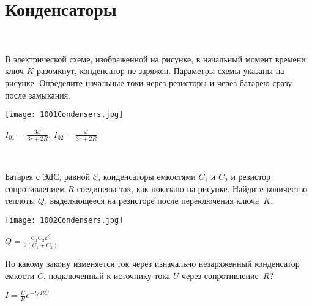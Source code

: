 \section{Конденсаторы}

\begin{ex}
\hspace{0pt} \\
\begin{minipage}{.65\textwidth}
В электрической схеме, изображенной на рисунке, в начальный момент времени ключ $K$ разомкнут, конденсатор не заряжен. 
Параметры схемы указаны на рисунке. Определите начальные токи через резисторы и через батарею сразу после замыкания.
\end{minipage}
\begin{minipage}{.35\textwidth}
\centering
\texttt{[image: 1001Condensers.jpg]}
\end{minipage}
\begin{ans}
$I_{01} = \frac{3 \mathcal{E}}{3r+2R}$, $I_{02} = \frac{\mathcal{E}}{3r+2R}$
\end{ans}
\end{ex}

\begin{ex}
\hspace{0pt} \\
\begin{minipage}{.65\textwidth}
Батарея с ЭДС, равной $\mathcal{E}$, конденсаторы емкостями $C_1$ и $C_2$ и резистор сопротивлением $R$ соединены так, как показано на рисунке. 
Найдите количество теплоты $Q$, выделяющееся на резисторе после переключения ключа~$K$.
\end{minipage}
\begin{minipage}{.35\textwidth}
\centering
\texttt{[image: 1002Condensers.jpg]}
\end{minipage}
\begin{ans}
$Q=\frac{C_1C_2 \mathcal{E}^2}{2(C_1+C_2)}$
\end{ans}
\end{ex}

\begin{ex} 
По какому закону изменяется ток через изначально незаряженный конденсатор емкости $C$, подключенный к источнику тока $U$ через сопротивление~$R$?
\begin{ans}
$I = \frac{U}{R} e^{-t/RC}$
\end{ans}
\end{ex}

